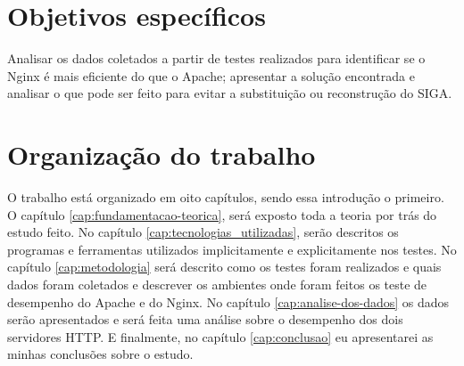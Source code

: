 \section{Objetivos específicos}
Analisar os dados coletados a partir de testes realizados para identificar se o 
Nginx é mais eficiente do que o Apache; apresentar a solução encontrada e 
analisar o que pode ser feito para evitar a substituição ou reconstrução do 
SIGA.\\
\section{Organização do trabalho}
O trabalho está organizado em oito capítulos, sendo essa introdução o primeiro. 
O capítulo \ref{cap:fundamentacao-teorica}, será exposto toda a teoria por trás 
do estudo feito. No capítulo \ref{cap:tecnologias_utilizadas}, serão descritos 
os programas e ferramentas utilizados implicitamente e explicitamente nos 
testes. No capítulo \ref{cap:metodologia} será descrito como os testes foram 
realizados e quais dados foram coletados e descrever os ambientes onde foram 
feitos os teste de desempenho do Apache e do Nginx. No capítulo 
\ref{cap:analise-dos-dados} os dados serão apresentados e 
será feita uma análise sobre o desempenho dos dois servidores HTTP. E 
finalmente, no capítulo \ref{cap:conclusao} eu apresentarei as minhas 
conclusões sobre o estudo.\\

